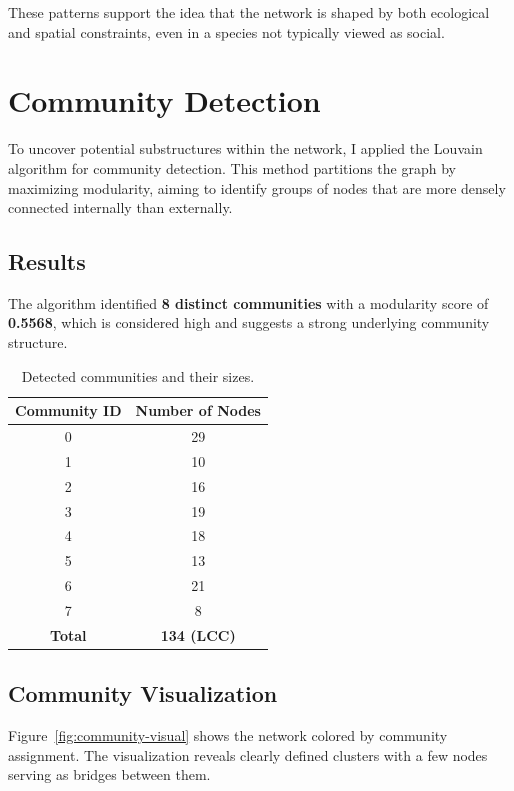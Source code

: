\documentclass[12pt]{report}
\begin{document}
These patterns support the idea that the network is shaped by both ecological and spatial constraints, even in a species not typically viewed as social.

\chapter*{Community Detection}

To uncover potential substructures within the network, I applied the Louvain algorithm for community detection. This method partitions the graph by maximizing modularity, aiming to identify groups of nodes that are more densely connected internally than externally.

\section*{Results}

The algorithm identified \textbf{8 distinct communities} with a modularity score of \textbf{0.5568}, which is considered high and suggests a strong underlying community structure.

\begin{table}[h!]
    \centering
    \begin{tabular}{|c|c|}
        \hline
        \textbf{Community ID} & \textbf{Number of Nodes} \\\hline
        0 & 29 \\\hline
        1 & 10 \\\hline
        2 & 16 \\\hline
        3 & 19 \\\hline
        4 & 18 \\\hline
        5 & 13 \\\hline
        6 & 21 \\\hline
        7 & 8 \\\hline
        \textbf{Total} & \textbf{134 (LCC)} \\\hline
    \end{tabular}
    \caption{Detected communities and their sizes.}
    \label{tab:community-sizes}
\end{table}

\section*{Community Visualization}

Figure~\ref{fig:community-visual} shows the network colored by community assignment. The visualization reveals clearly defined clusters with a few nodes serving as bridges between them.
\end{document}
